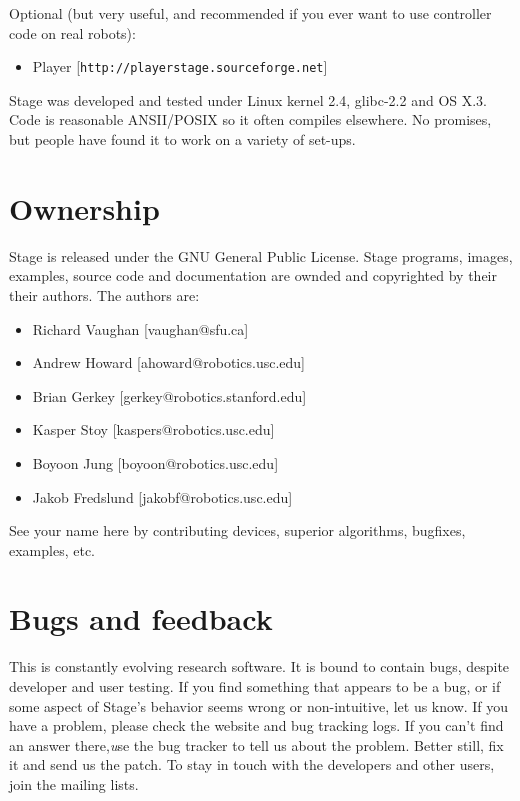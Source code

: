 \documentclass[letter,11pt,twoside]{report}
\def\HOMEPAGE {{\tt http://playerstage.sourceforge.net}}
\begin{document}
Optional (but very useful, and recommended if you ever want to use
controller code on real robots):
\begin{itemize}
\item Player [\HOMEPAGE]
\end{itemize}

Stage was developed and tested under Linux kernel 2.4, glibc-2.2 and
OS X.3. Code is reasonable ANSII/POSIX so it often compiles
elsewhere. No promises, but people have found it to work on a variety
of set-ups.

\section{Ownership}

Stage is released under the GNU General Public License. Stage
programs, images, examples, source code and documentation are
ownded and copyrighted by their their authors. The authors are:

\begin{itemize}
\item[] Richard Vaughan [vaughan@sfu.ca]
\item[] Andrew Howard [ahoward@robotics.usc.edu]
\item[] Brian Gerkey [gerkey@robotics.stanford.edu]
\item[] Kasper Stoy [kaspers@robotics.usc.edu]
\item[] Boyoon Jung [boyoon@robotics.usc.edu]
\item[] Jakob Fredslund [jakobf@robotics.usc.edu]
\end{itemize}

See your name here by contributing devices, superior
algorithms, bugfixes, examples, etc.

\section{Bugs and feedback}

This is constantly evolving research software. It is bound to
contain bugs, despite developer and user testing.  If you find
something that appears to be a bug, or if some aspect of Stage's
behavior seems wrong or non-intuitive, let us know. If you have a
problem, please check the website and bug tracking logs. If you
can't find an answer there,{\emph use the bug tracker} to tell us about
the problem. Better still, fix it and send us the patch. To stay
in touch with the developers and other users, join the mailing
lists.
\end{document}
